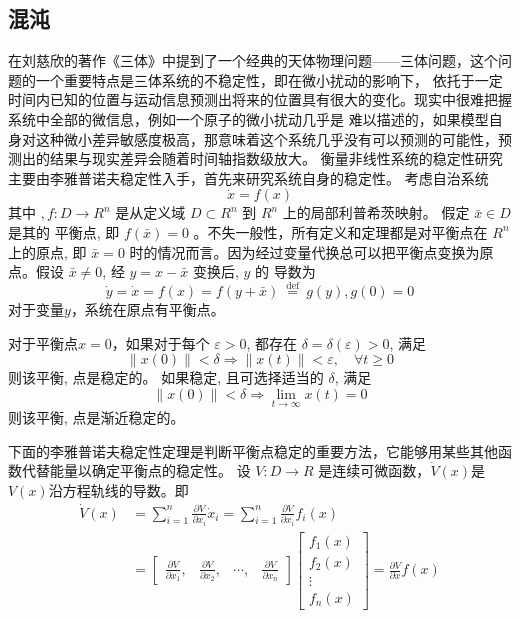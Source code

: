 \subsection{混沌}
在刘慈欣的著作《三体》中提到了一个经典的天体物理问题——三体问题，这个问题的一个重要特点是三体系统的不稳定性，即在微小扰动的影响下，
依托于一定时间内已知的位置与运动信息预测出将来的位置具有很大的变化。现实中很难把握系统中全部的微信息，例如一个原子的微小扰动几乎是
难以描述的，如果模型自身对这种微小差异敏感度极高，那意味着这个系统几乎没有可以预测的可能性，预测出的结果与现实差异会随着时间轴指数级放大。
衡量非线性系统的稳定性研究主要由李雅普诺夫稳定性入手，首先来研究系统自身的稳定性。
考虑自治系统
\begin{equation}
    \dot{x}=f(x)
\end{equation}
其中 $, f: D \rightarrow R^n$ 是从定义域 $D \subset R^n$ 到 $R^n$ 上的局部利普希茨映射。
假定 $\bar{x} \in D$ 是其的 平衡点, 即 $f(\bar{x})=0$ 。不失一般性，所有定义和定理都是对平衡点在 $R^n$ 上的原点,
即 $\bar{x}=0$ 时的情况而言。因为经过变量代换总可以把平衡点变换为原点。假设 $\bar{x} \neq 0$, 经 $y=x-\bar{x}$ 变换后, $y$ 的
导数为
\begin{equation}
    \dot{y}=\dot{x}=f(x)=f(y+\bar{x}) \stackrel{\text { def }}{=} g(y), g(0)=0
\end{equation}
对于变量$y$，系统在原点有平衡点。
\begin{definition}
    对于平衡点$x=0$，如果对于每个 $\varepsilon>0$, 都存在 $\delta=\delta(\varepsilon)>0$, 满足
    \begin{equation}
        \|x(0)\|<\delta \Rightarrow\|x(t)\|<\varepsilon, \quad \forall t \geqslant 0
    \end{equation}
    则该平衡, 点是稳定的。
    如果稳定, 且可选择适当的 $\delta$, 满足
    \begin{equation}
        \|x(0)\|<\delta \Rightarrow \lim _{t \rightarrow \infty} x(t)=0
    \end{equation}
    则该平衡, 点是渐近稳定的。
\end{definition}
下面的李雅普诺夫稳定性定理是判断平衡点稳定的重要方法，它能够用某些其他函数代替能量以确定平衡点的稳定性。
设 $V: D \rightarrow R$ 是连续可微函数，$\dot{V}(x)$是$V(x)$沿方程轨线的导数。即
\begin{equation}
    \begin{aligned}
    \dot{V}(x) & =\sum_{i=1}^n \frac{\partial V}{\partial x_i} \dot{x}_i=\sum_{i=1}^n \frac{\partial V}{\partial x_i} f_i(x) \\
    & =\left[\begin{array}{llll}
    \frac{\partial V}{\partial x_1}, & \frac{\partial V}{\partial x_2}, & \cdots, & \frac{\partial V}{\partial x_n}
    \end{array}\right]\left[\begin{array}{c}
    f_1(x) \\
    f_2(x) \\
    \vdots \\
    f_n(x)
    \end{array}\right]=\frac{\partial V}{\partial x} f(x)
    \end{aligned}
\end{equation}

